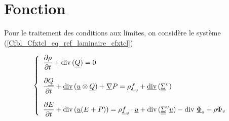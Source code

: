 
%
%
%
%



\hypertarget{cfxtcl}{}

\vspace{1cm}
\section*{Fonction}

Pour le traitement des conditions aux limites, on consid\`ere
le syst\`eme (\ref{Cfbl_Cfxtcl_eq_ref_laminaire_cfxtcl})

\begin{equation}\label{Cfbl_Cfxtcl_eq_ref_laminaire_cfxtcl}
\left\{\begin{array}{l}

\displaystyle\frac{\partial\rho}{\partial t} + \text{div}\,(\underline{Q}) = 0 \\
\\
\displaystyle\frac{\partial\underline{Q}}{\partial t}
+ \underline{\text{div}}\,(\underline{u} \otimes \underline{Q}) + \underline{\nabla}{P}
= \rho \underline{f}_v + \underline{\text{div}}\,(\underline{\underline{\Sigma}}^v) \\
\\
\displaystyle\frac{\partial E}{\partial t} + \text{div}\,( \underline{u} (E+P) )
= \rho\underline{f}_v\cdot\underline{u} + \text{div}\,(\underline{\underline{\Sigma}}^v \underline{u})
- \text{div}\,{\,\underline{\Phi}_s} + \rho\Phi_v

\end{array}\right.
\end{equation}

